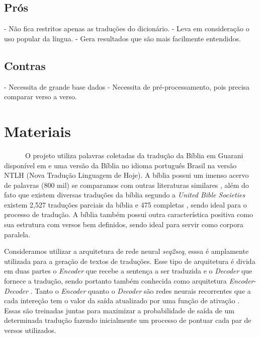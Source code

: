 \documentclass[12pt]{article}
\begin{document}
\subsection{Prós}

- Não fica restritos apenas as traduções do dicionário.\newline
- Leva em consideração o uso popular da língua.\newline
- Gera resultados que são mais facilmente entendidos.

\subsection{Contras}

- Necessita de grande base dados\newline
- Necessita de pré-processamento, pois precisa comparar verso a verso.

\section{Materiais}

~~~~~~O projeto utiliza palavras coletadas da tradução da Bíblia em Guarani disponível em \cite{angelo} e uma versão da Bíblia no idioma português Brasil na versão NTLH (Nova Tradução Linguagem de Hoje). A bíblia possui um imenso acervo de palavras (800 mil) se comparamos com outras literaturas similares \cite{Christodouloupoulos:2015:MPC:2767936.2767953}, além do fato que existem diversas traduções da bíblia segundo a \textit{United Bible Societies} existem 2,527 traduções parciais da bíblia e 475 completas \cite{Christodouloupoulos:2015:MPC:2767936.2767953}, sendo ideal para o processo de tradução. A bíblia também possui outra característica positiva como sua estrutura com versos bem definidos, sendo ideal para servir como corpora paralela.

Consideramos utilizar a  arquitetura de rede neural \textit{seq2seq}, esssa é amplamente utilizada para a geração de textos de traduções. Esse tipo de arquitetura é divida em duas partes o \textit{Encoder} que recebe a sentença a ser traduzida e o \textit{Decoder} que fornece a tradução, sendo portanto também conhecida como arquitetura \textit{Encoder}-\textit{Decoder} \cite{DBLP:journals/corr/ChoMGBSB14}. Tanto o \textit{Encoder} quanto o \textit{Decoder} são redes neurais recorrentes que a cada intereção tem o valor da saída atualizado por uma função de ativação \cite{DBLP:journals/corr/ChoMGBSB14}. Essas são treinadas juntas para maximizar a probabilidade de saída de um determinada tradução fazendo inicialmente um processo de pontuar cada par de versos utilizados.
\end{document}
